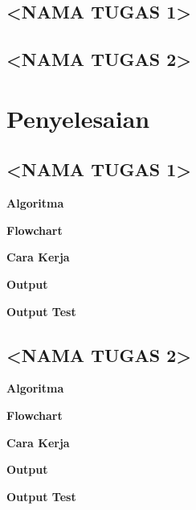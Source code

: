 \documentclass{article}
\begin{document}
\subsection{<NAMA TUGAS 1>}


\subsection{<NAMA TUGAS 2>}

\section{Penyelesaian}

\subsection{<NAMA TUGAS 1>}

\textbf{Algoritma}

\textbf{Flowchart}

\textbf{Cara Kerja}

\textbf{Output}

\textbf{Output Test}

\subsection{<NAMA TUGAS 2>}

\textbf{Algoritma}

\textbf{Flowchart}

\textbf{Cara Kerja}

\textbf{Output}

\textbf{Output Test}
\end{document}
